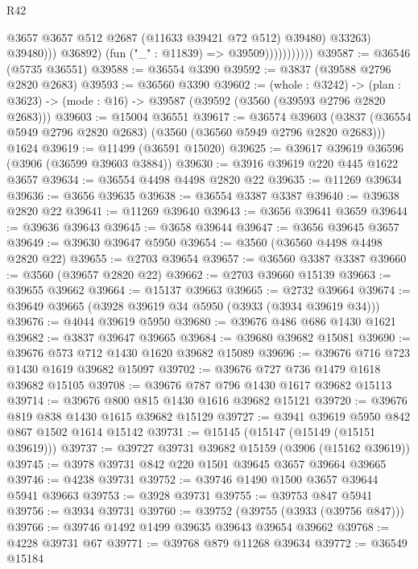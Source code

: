 \begin{lexlean}{R42}
\begin{coremodule}
                                    @3657
                                    @3657
                                    @512
                                    @2687
                                    (@11633 @39421 @72 @512)
                                    @39480)
                                  @33263)
                                @39480)))
                          @36892)
                        (fun ("_" : @11839) => @39509)))))))))))
@39587 := @36546 (@5735 @36551)
@39588 := @36554 @3390
@39592 := @3837 (@39588 @2796 @2820 @2683)
@39593 := @36560 @3390
@39602 := (whole : @3242) ->
  (plan : @3623) -> (mode : @16) -> @39587 (@39592 (@3560 (@39593 @2796 @2820 @2683)))
@39603 := @15004 @36551
@39617 := @36574
    @39603
    (@3837 (@36554 @5949 @2796 @2820 @2683) (@3560 (@36560 @5949 @2796 @2820 @2683)))
    @1624
@39619 := @11499 (@36591 @15020)
@39625 := @39617 @39619 @36596 (@3906 (@36599 @39603 @3884))
@39630 := @3916 @39619 @220 @445 @1622 @3657
@39634 := @36554 @4498 @4498 @2820 @22
@39635 := @11269 @39634
@39636 := @3656 @39635
@39638 := @36554 @3387 @3387
@39640 := @39638 @2820 @22
@39641 := @11269 @39640
@39643 := @3656 @39641 @3659
@39644 := @39636 @39643
@39645 := @3658 @39644
@39647 := @3656 @39645 @3657
@39649 := @39630 @39647 @5950
@39654 := @3560 (@36560 @4498 @4498 @2820 @22)
@39655 := @2703 @39654
@39657 := @36560 @3387 @3387
@39660 := @3560 (@39657 @2820 @22)
@39662 := @2703 @39660 @15139
@39663 := @39655 @39662
@39664 := @15137 @39663
@39665 := @2732 @39664
@39674 := @39649 @39665 (@3928 @39619 @34 @5950 (@3933 (@3934 @39619 @34)))
@39676 := @4044 @39619 @5950
@39680 := @39676 @486 @686 @1430 @1621
@39682 := @3837 @39647 @39665
@39684 := @39680 @39682 @15081
@39690 := @39676 @573 @712 @1430 @1620 @39682 @15089
@39696 := @39676 @716 @723 @1430 @1619 @39682 @15097
@39702 := @39676 @727 @736 @1479 @1618 @39682 @15105
@39708 := @39676 @787 @796 @1430 @1617 @39682 @15113
@39714 := @39676 @800 @815 @1430 @1616 @39682 @15121
@39720 := @39676 @819 @838 @1430 @1615 @39682 @15129
@39727 := @3941 @39619 @5950 @842 @867 @1502 @1614 @15142
@39731 := @15145 (@15147 (@15149 (@15151 @39619)))
@39737 := @39727 @39731 @39682 @15159 (@3906 (@15162 @39619))
@39745 := @3978 @39731 @842 @220 @1501 @39645 @3657 @39664 @39665
@39746 := @4238 @39731
@39752 := @39746 @1490 @1500 @3657 @39644 @5941 @39663
@39753 := @3928 @39731
@39755 := @39753 @847 @5941
@39756 := @3934 @39731
@39760 := @39752 (@39755 (@3933 (@39756 @847)))
@39766 := @39746 @1492 @1499 @39635 @39643 @39654 @39662
@39768 := @4228 @39731 @67
@39771 := @39768 @879 @11268 @39634
@39772 := @36549 @15184

\end{coremodule}
\end{lexlean}
